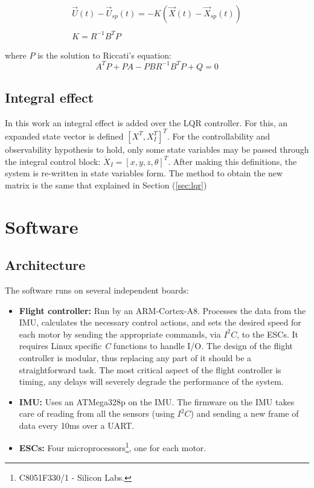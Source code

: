 \documentclass[conference]{IEEEtran}
\newcommand{\refp}[1]{(\ref{#1})}
\begin{document}
\begin{equation}
\begin{array}{c}
\vec{U}(t)-\vec{U}_{sp}(t) = -K(\vec{X}(t)-\vec{X}_{sp}(t))\\
\\
K = R^{-1}B^TP
\end{array}
\label{eq:lqr-sol}
\end{equation}

where $P$ is the solution to Riccati's equation:
\begin{equation}
  \label{eq:riccati}
  A^TP + PA - PBR^{-1}B^TP + Q = 0
\end{equation}

\subsection{Integral effect}
In this work an integral effect is added over the LQR controller. For this, an expanded state vector is defined $[X^T, X_I^T]^T$. For the controllability and observability hypothesis to hold, only some state variables may be passed through the integral control block: $\dot{X}_I =[x,y,z,\theta]^T$. After making this definitions, the system is re-written in state variables form. The method to obtain the new matrix is the same that explained in Section \refp{sec:lqr}
\section{Software}

\subsection{Architecture}
\label{sec:software-arch}

The software runs on several independent boards:

\begin{itemize}
\item \textbf{Flight controller:} Run by an ARM-Cortex-A8. Processes the data from the IMU, calculates the necessary control actions, and sets the desired speed for each motor by sending the appropriate commands, via $I^2C$, to the ESCs. It requires Linux specific \textit{C} functions to handle I/O. The design of the flight controller is modular, thus replacing any part of it should be a straightforward task. The most critical aspect of the flight controller is timing, any delays will severely degrade the performance of the system.
\item \textbf{IMU:} Uses an ATMega328p on the IMU. The firmware on the IMU takes care of reading from all the sensors (using $I^2C$) and sending a new frame of data every 10ms over a UART.
\item \textbf{ESCs:} Four microprocessors\footnote{C8051F330/1 - Silicon Labs.}, one for each motor.
\end{itemize}
\end{document}
